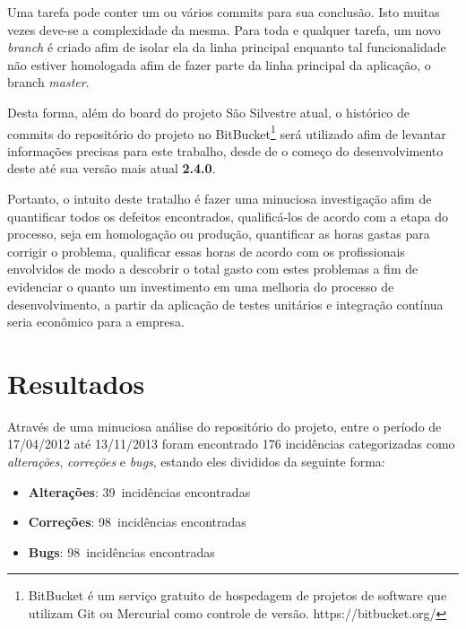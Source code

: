 \documentclass[11pt, a4paper]{article}
\begin{document}
Uma tarefa pode conter um ou vários commits para sua conclusão. Isto muitas vezes deve-se a complexidade da mesma. Para toda e qualquer tarefa, um novo \textit{branch} é criado afim de isolar ela da linha principal enquanto tal funcionalidade não estiver homologada afim de fazer parte da linha principal da aplicação, o branch \textit{master}.

Desta forma, além do board do projeto São Silvestre atual, o histórico de commits do repositório do projeto no BitBucket\footnote{BitBucket é um serviço gratuito de hospedagem de projetos de software que utilizam Git ou Mercurial como controle de versão. https://bitbucket.org/} será utilizado afim de levantar informações precisas para este trabalho, desde de o começo do desenvolvimento deste até sua versão mais atual \textbf{2.4.0}.

Portanto, o intuito deste tratalho é fazer uma minuciosa investigação afim de quantificar todos os defeitos encontrados, qualificá-los de acordo com a etapa do processo, seja em homologação ou produção, quantificar as horas gastas para corrigir o problema, qualificar essas horas de acordo com os profissionais envolvidos de modo a descobrir o total gasto com estes problemas a fim de evidenciar o quanto um investimento em uma melhoria do processo de desenvolvimento, a partir da aplicação de testes unitários e integração contínua seria econômico para a empresa.

\section{Resultados}\label{sec:resultados}
Através de uma minuciosa análise do repositório do projeto, entre o período de 17/04/2012 até 13/11/2013 foram encontrado 176 incidências categorizadas como \textit{alterações}, \textit{correções} e \textit{bugs}, estando eles divididos da seguinte forma:

\newcommand{\alteracoes}{39}
\newcommand{\correcoes}{98}
\newcommand{\bugs}{98}

\begin{itemize}
	\item \textbf{Alterações}: \alteracoes~incidências encontradas
	\item \textbf{Correções}: \correcoes~incidências encontradas
	\item \textbf{Bugs}: \bugs~incidências encontradas
\end{itemize}
\end{document}

